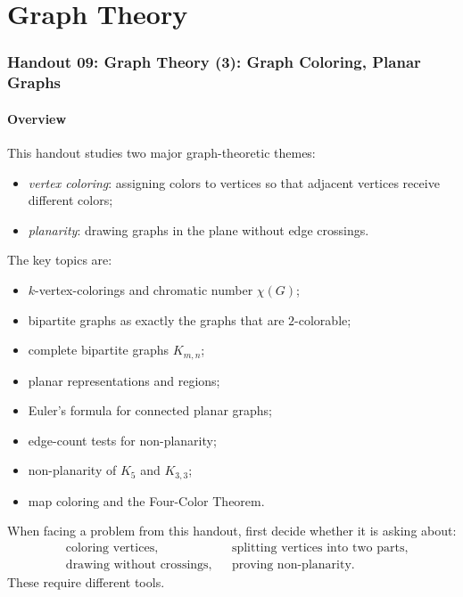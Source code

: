 \part{Graph Theory}
\section{Handout 09: Graph Theory (3): Graph Coloring, Planar Graphs}

\subsection{Overview}

This handout studies two major graph-theoretic themes:
\begin{itemize}[leftmargin=*]
    \item \emph{vertex coloring}: assigning colors to vertices so that adjacent vertices receive different colors;
    \item \emph{planarity}: drawing graphs in the plane without edge crossings.
\end{itemize}

The key topics are:
\begin{itemize}[leftmargin=*]
    \item \(k\)-vertex-colorings and chromatic number \(\chi(G)\);
    \item bipartite graphs as exactly the graphs that are \(2\)-colorable;
    \item complete bipartite graphs \(K_{m,n}\);
    \item planar representations and regions;
    \item Euler's formula for connected planar graphs;
    \item edge-count tests for non-planarity;
    \item non-planarity of \(K_5\) and \(K_{3,3}\);
    \item map coloring and the Four-Color Theorem.
\end{itemize}

\begin{examtip}[title={Main diagnostic for Handout 09}]
When facing a problem from this handout, first decide whether it is asking about:
\[
\begin{aligned}
&\text{coloring vertices}, && \text{splitting vertices into two parts},\\
&\text{drawing without crossings}, && \text{proving non-planarity}.
\end{aligned}
\]
These require different tools.
\end{examtip}

